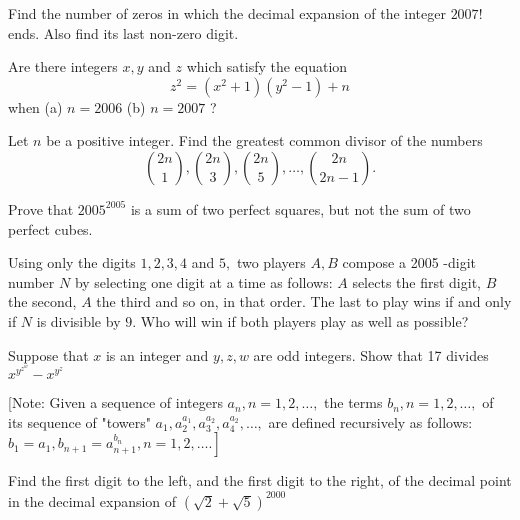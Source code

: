 \documentclass{pset}
\begin{document}
\begin{problems}
\begin{problem}[IrMO 2007 Q9]
    Find the number of zeros in which the decimal expansion of the integer \(2007 !\) ends. Also find its last non-zero digit.
\end{problem}

\begin{problem}[IrMO 2006 Q1]
    Are there integers \(x, y\) and \(z\) which satisfy the equation
    $$
    z^{2}=\left(x^{2}+1\right)\left(y^{2}-1\right)+n
    $$
    when (a) $n=2006$ (b) $n=2007$ ?
\end{problem}

\begin{problem}[IrMO 2009 Q9]
    Let \(n\) be a positive integer. Find the greatest common divisor of the numbers
    $$
    \binom{2n}{1}, \binom{2n}{3}, \binom{2n}{5}, \dots, \binom{2n}{2n - 1}.
    $$
\end{problem}

\begin{problem}[IrMO 2005 Q1]
    Prove that \(2005^{2005}\) is a sum of two perfect squares, but not the sum of two perfect cubes.
\end{problem}

\begin{problem}[IrMO 2005 Q7]
    Using only the digits \(1,2,3,4\) and \(5,\) two players \(A, B\) compose a 2005 -digit number
    \(N\) by selecting one digit at a time as follows: \(A\) selects the first digit, \(B\) the second, \(A\) the third and so on, in that order. The last to play wins if and only if \(N\) is divisible by \(9 .\) Who will win if both players play as well as possible?
\end{problem}

\begin{problem}[IrMO 2005 Q8]
    Suppose that \(x\) is an integer and \(y, z, w\) are odd integers. Show that 17 divides \(x^{y^{z^{w}}}-x^{y^{z}}\)
    
    [Note: Given a sequence of integers \(a_{n}, n=1,2, \ldots,\) the terms \(b_{n}, n=1,2, \ldots,\) of its sequence of "towers" \(a_{1}, a_{2}^{a_{1}}, a_{3}^{a_{2}}, a_{4}^{a_{2}}, \ldots,\) are defined recursively as follows:
    \(\left.b_{1}=a_{1}, b_{n+1}=a_{n+1}^{b_{n}}, n=1,2, \ldots .\right]\)
\end{problem}

\begin{problem}[IrMO 2005 Q9]
    Find the first digit to the left, and the first digit to the right, of the decimal point in the decimal expansion of \((\sqrt{2}+\sqrt{5})^{2000}\)
\end{problem}


\end{problems}
\end{document}
